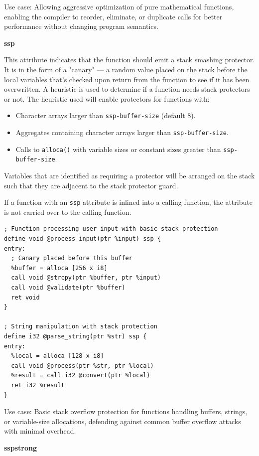 Use case: Allowing aggressive optimization of pure mathematical functions, enabling the compiler to reorder, eliminate, or duplicate calls for better performance without changing program semantics.

\textbf{ssp}

This attribute indicates that the function should emit a stack smashing protector.
It is in the form of a "canary" — a random value placed on the stack before the local variables that's checked upon return from the function to see if it has been overwritten.
A heuristic is used to determine if a function needs stack protectors or not.
The heuristic used will enable protectors for functions with:

\begin{itemize}
\item Character arrays larger than \texttt{ssp-buffer-size} (default 8).
\item Aggregates containing character arrays larger than \texttt{ssp-buffer-size}.
\item Calls to \texttt{alloca()} with variable sizes or constant sizes greater than \texttt{ssp-buffer-size}.
\end{itemize}

Variables that are identified as requiring a protector will be arranged on the stack such that they are adjacent to the stack protector guard.

If a function with an \texttt{ssp} attribute is inlined into a calling function, the attribute is not carried over to the calling function.

\begin{lstlisting}[style=ir]
; Function processing user input with basic stack protection
define void @process_input(ptr %input) ssp {
entry:
  ; Canary placed before this buffer
  %buffer = alloca [256 x i8]
  call void @strcpy(ptr %buffer, ptr %input)
  call void @validate(ptr %buffer)
  ret void
}

; String manipulation with stack protection
define i32 @parse_string(ptr %str) ssp {
entry:
  %local = alloca [128 x i8]
  call void @process(ptr %str, ptr %local)
  %result = call i32 @convert(ptr %local)
  ret i32 %result
}
\end{lstlisting}

Use case: Basic stack overflow protection for functions handling buffers, strings, or variable-size allocations, defending against common buffer overflow attacks with minimal overhead.

\textbf{sspstrong}

